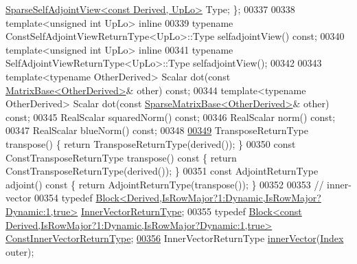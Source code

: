 \begin{DoxyCode}
      \hyperlink{group___sparse_core___module_class_eigen_1_1_sparse_self_adjoint_view}{SparseSelfAdjointView<const Derived, UpLo>} Type; \};
00337 
00338     \textcolor{keyword}{template}<\textcolor{keywordtype}{unsigned} \textcolor{keywordtype}{int} UpLo> \textcolor{keyword}{inline} 
00339     \textcolor{keyword}{typename} ConstSelfAdjointViewReturnType<UpLo>::Type selfadjointView() \textcolor{keyword}{const};
00340     \textcolor{keyword}{template}<\textcolor{keywordtype}{unsigned} \textcolor{keywordtype}{int} UpLo> \textcolor{keyword}{inline}
00341     \textcolor{keyword}{typename} SelfAdjointViewReturnType<UpLo>::Type selfadjointView();
00342 
00343     \textcolor{keyword}{template}<\textcolor{keyword}{typename} OtherDerived> Scalar dot(\textcolor{keyword}{const} \hyperlink{group___core___module_class_eigen_1_1_matrix_base}{MatrixBase<OtherDerived>}& 
      other) \textcolor{keyword}{const};
00344     \textcolor{keyword}{template}<\textcolor{keyword}{typename} OtherDerived> Scalar dot(\textcolor{keyword}{const} 
      \hyperlink{group___sparse_core___module_class_eigen_1_1_sparse_matrix_base}{SparseMatrixBase<OtherDerived>}& other) \textcolor{keyword}{const};
00345     RealScalar squaredNorm() \textcolor{keyword}{const};
00346     RealScalar norm()  \textcolor{keyword}{const};
00347     RealScalar blueNorm() \textcolor{keyword}{const};
00348 
\hyperlink{group___sparse_core___module_a6557dcd3512c07370630d5ce0c3fbd3e}{00349}     TransposeReturnType transpose() \{ \textcolor{keywordflow}{return} TransposeReturnType(derived()); \}
00350     \textcolor{keyword}{const} ConstTransposeReturnType transpose()\textcolor{keyword}{ const }\{ \textcolor{keywordflow}{return} ConstTransposeReturnType(derived()); \}
00351     \textcolor{keyword}{const} AdjointReturnType adjoint()\textcolor{keyword}{ const }\{ \textcolor{keywordflow}{return} AdjointReturnType(transpose()); \}
00352 
00353     \textcolor{comment}{// inner-vector}
00354     \textcolor{keyword}{typedef} \hyperlink{group___core___module_class_eigen_1_1_block}{Block<Derived,IsRowMajor?1:Dynamic,IsRowMajor?Dynamic:1,true>}
             \hyperlink{group___core___module_class_eigen_1_1_block}{InnerVectorReturnType};
00355     \textcolor{keyword}{typedef} \hyperlink{group___core___module_class_eigen_1_1_block}{Block<const Derived,IsRowMajor?1:Dynamic,IsRowMajor?Dynamic:1,true>}
       \hyperlink{group___core___module_class_eigen_1_1_block}{ConstInnerVectorReturnType};
\hyperlink{group___sparse_core___module_aa56c62b99e26e37c5f93ea83e0c3ba58}{00356}     InnerVectorReturnType \hyperlink{group___sparse_core___module_a65aaf3b50d205011e2bfa0de24756cce}{innerVector}(\hyperlink{group___core___module_a554f30542cc2316add4b1ea0a492ff02}{Index} outer);

\end{DoxyCode}
